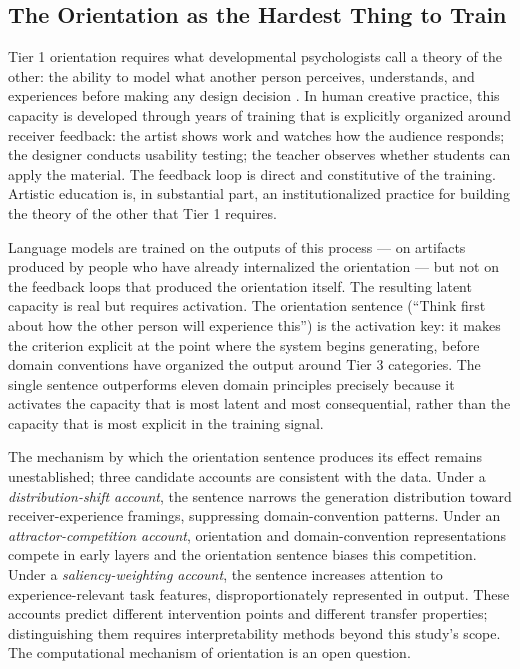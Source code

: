 \subsection{The Orientation as the Hardest Thing to Train}

Tier 1 orientation requires what developmental psychologists call a theory of the other:
the ability to model what another person perceives, understands, and experiences before
making any design decision \cite{premack_woodruff}. In human creative practice, this
capacity is developed through years of training that is explicitly organized around
receiver feedback: the artist shows work and watches how the audience responds; the
designer conducts usability testing; the teacher observes whether students can apply the
material. The feedback loop is direct and constitutive of the training. Artistic education
is, in substantial part, an institutionalized practice for building the theory of the
other that Tier 1 requires.

Language models are trained on the outputs of this process --- on artifacts produced by
people who have already internalized the orientation --- but not on the feedback loops
that produced the orientation itself. The resulting latent capacity is real but requires
activation. The orientation sentence (``Think first about how the other person will
experience this'') is the activation key: it makes the criterion explicit at the point
where the system begins generating, before domain conventions have organized the output
around Tier 3 categories. The single sentence outperforms eleven domain principles
precisely because it activates the capacity that is most latent and most consequential,
rather than the capacity that is most explicit in the training signal.

The mechanism by which the orientation sentence produces its effect remains unestablished;
three candidate accounts are consistent with the data. Under a \emph{distribution-shift
account}, the sentence narrows the generation distribution toward receiver-experience
framings, suppressing domain-convention patterns. Under an \emph{attractor-competition
account}, orientation and domain-convention representations compete in early layers and
the orientation sentence biases this competition. Under a \emph{saliency-weighting
account}, the sentence increases attention to experience-relevant task features,
disproportionately represented in output. These accounts predict different intervention
points and different transfer properties; distinguishing them requires interpretability
methods beyond this study's scope. The computational mechanism of orientation is an open
question.

